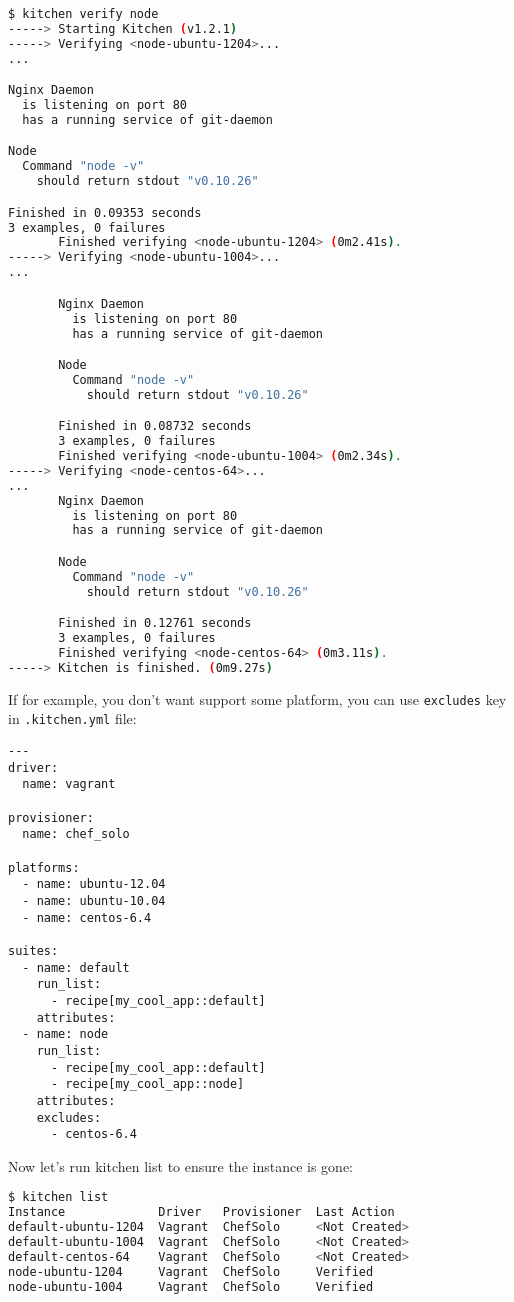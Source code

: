 \begin{lstlisting}[language=Bash,label=lst:testing-test-kitchen42]
$ kitchen verify node
-----> Starting Kitchen (v1.2.1)
-----> Verifying <node-ubuntu-1204>...
...

Nginx Daemon
  is listening on port 80
  has a running service of git-daemon

Node
  Command "node -v"
    should return stdout "v0.10.26"

Finished in 0.09353 seconds
3 examples, 0 failures
       Finished verifying <node-ubuntu-1204> (0m2.41s).
-----> Verifying <node-ubuntu-1004>...
...

       Nginx Daemon
         is listening on port 80
         has a running service of git-daemon

       Node
         Command "node -v"
           should return stdout "v0.10.26"

       Finished in 0.08732 seconds
       3 examples, 0 failures
       Finished verifying <node-ubuntu-1004> (0m2.34s).
-----> Verifying <node-centos-64>...
...
       Nginx Daemon
         is listening on port 80
         has a running service of git-daemon

       Node
         Command "node -v"
           should return stdout "v0.10.26"

       Finished in 0.12761 seconds
       3 examples, 0 failures
       Finished verifying <node-centos-64> (0m3.11s).
-----> Kitchen is finished. (0m9.27s)
\end{lstlisting}

If for example, you don't want support some platform, you can use \lstinline!excludes! key in \lstinline!.kitchen.yml! file:

\begin{lstlisting}[label=lst:testing-test-kitchen43]
---
driver:
  name: vagrant

provisioner:
  name: chef_solo

platforms:
  - name: ubuntu-12.04
  - name: ubuntu-10.04
  - name: centos-6.4

suites:
  - name: default
    run_list:
      - recipe[my_cool_app::default]
    attributes:
  - name: node
    run_list:
      - recipe[my_cool_app::default]
      - recipe[my_cool_app::node]
    attributes:
    excludes:
      - centos-6.4
\end{lstlisting}

Now let's run kitchen list to ensure the instance is gone:

\begin{lstlisting}[language=Bash,label=lst:testing-test-kitchen44]
$ kitchen list
Instance             Driver   Provisioner  Last Action
default-ubuntu-1204  Vagrant  ChefSolo     <Not Created>
default-ubuntu-1004  Vagrant  ChefSolo     <Not Created>
default-centos-64    Vagrant  ChefSolo     <Not Created>
node-ubuntu-1204     Vagrant  ChefSolo     Verified
node-ubuntu-1004     Vagrant  ChefSolo     Verified
\end{lstlisting}